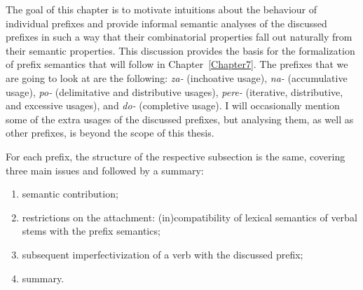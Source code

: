  

The goal of this chapter is to motivate intuitions about the behaviour of individual prefixes and provide informal semantic analyses of the discussed prefixes in such a way that their combinatorial properties fall out naturally from their semantic properties. 
This discussion provides the basis for the formalization of prefix semantics that will follow in Chapter~\ref{Chapter7}. The prefixes that we are going to look at are the following: \textit{za-} (inchoative usage), \textit{na-} (accumulative usage), \textit{po-} (delimitative and distributive usages), \textit{pere-} (iterative, distributive, and excessive usages), and \textit{do-} (completive usage). I will occasionally mention some of the extra usages of the discussed prefixes, but analysing them, as well as other prefixes, is beyond the scope of this thesis.

For each prefix, the structure of the respective subsection is the same, covering three main issues and followed by a summary:
\begin{enumerate}
\item semantic contribution;
\item restrictions on the attachment: (in)compatibility of lexical semantics of verbal stems with the prefix semantics;
\item subsequent imperfectivization of a verb with the discussed prefix;
\item summary.
\end{enumerate}

